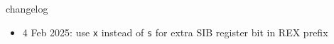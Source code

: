 \graphicspath{{./figures/}}
\title{}
\date{}



{\changelogmode
\begin{frame}{changelog}
\begin{itemize}
\item 4 Feb 2025: use \texttt{x} instead of \texttt{s} for extra SIB register bit in REX prefix
\end{itemize}
\end{frame}
}

\begin{frame}
    \titlepage
\end{frame}


